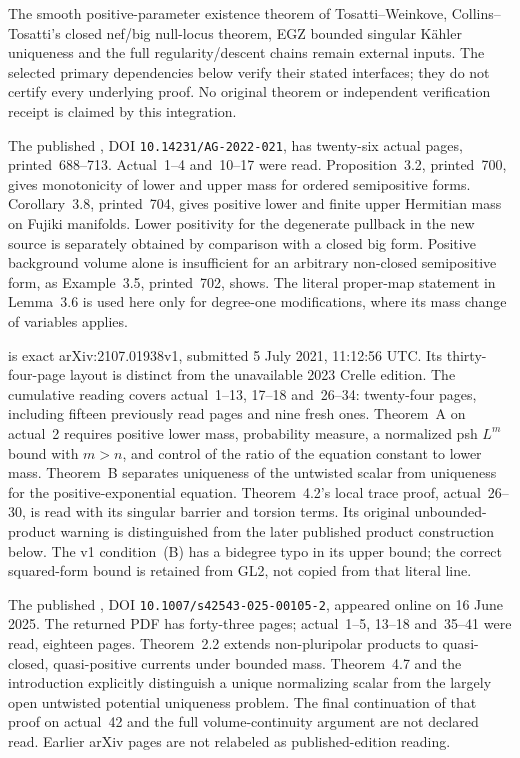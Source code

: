 The smooth positive-parameter existence theorem of Tosatti--Weinkove,
Collins--Tosatti's closed nef/big null-locus theorem, EGZ bounded
singular K\"ahler uniqueness and the full regularity/descent chains
remain external inputs. The selected primary dependencies below
verify their stated interfaces; they do not certify every underlying
proof. No original theorem or independent verification receipt is
claimed by this integration.

The published \cite{GuedjLu22VolumesPublished}, DOI
\nolinkurl{10.14231/AG-2022-021}, has twenty-six actual pages,
printed~688--713. Actual~1--4 and~10--17 were read.
Proposition~3.2, printed~700, gives monotonicity of lower and upper
mass for ordered semipositive forms. Corollary~3.8, printed~704,
gives positive lower and finite upper Hermitian mass on Fujiki
manifolds. Lower positivity for the degenerate pullback in the new
source is separately obtained by comparison with a closed big form.
Positive background volume alone is insufficient for an arbitrary
non-closed semipositive form, as Example~3.5, printed~702, shows.
The literal proper-map statement in Lemma~3.6 is used here only for
degree-one modifications, where its mass change of variables applies.

\cite{GuedjLu21Envelopes3V1} is exact arXiv:2107.01938v1, submitted
5 July 2021, 11:12:56 UTC. Its thirty-four-page layout is distinct
from the unavailable 2023 Crelle edition. The cumulative reading
covers actual~1--13, 17--18 and~26--34: twenty-four pages, including
fifteen previously read pages and nine fresh ones. Theorem~A on
actual~2 requires positive lower mass, probability measure, a
normalized psh $L^m$ bound with $m>n$, and control of the ratio
of the equation constant to lower mass. Theorem~B separates
uniqueness of the untwisted scalar from uniqueness for the
positive-exponential equation. Theorem~4.2's local trace proof,
actual~26--30, is read with its singular barrier and torsion terms.
Its original unbounded-product warning is distinguished from the
later published product construction below. The v1 condition~(B)
has a bidegree typo in its upper bound; the correct squared-form
bound is retained from GL2, not copied from that literal line.

The published \cite{BoucksomGuedjLu25VolumesPublished}, DOI
\nolinkurl{10.1007/s42543-025-00105-2}, appeared online on
16 June 2025. The returned PDF has forty-three pages; actual~1--5,
13--18 and~35--41 were read, eighteen pages. Theorem~2.2 extends
non-pluripolar products to quasi-closed, quasi-positive currents
under bounded mass. Theorem~4.7 and the introduction explicitly
distinguish a unique normalizing scalar from the largely open
untwisted potential uniqueness problem. The final continuation of
that proof on actual~42 and the full volume-continuity argument
are not declared read. Earlier arXiv pages are not relabeled as
published-edition reading.

